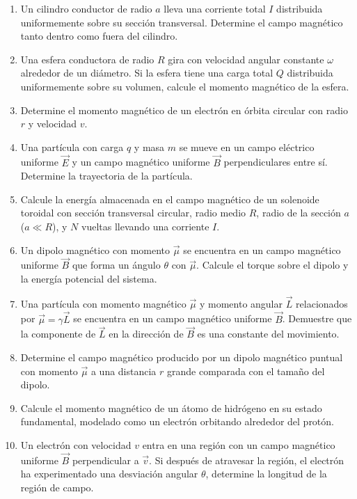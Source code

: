 \documentclass[12pt,a4paper]{book}
\begin{document}
\begin{enumerate}
\item Un cilindro conductor de radio $a$ lleva una corriente total $I$ distribuida uniformemente sobre su sección transversal. Determine el campo magnético tanto dentro como fuera del cilindro.

\item Una esfera conductora de radio $R$ gira con velocidad angular constante $\omega$ alrededor de un diámetro. Si la esfera tiene una carga total $Q$ distribuida uniformemente sobre su volumen, calcule el momento magnético de la esfera.

\item Determine el momento magnético de un electrón en órbita circular con radio $r$ y velocidad $v$.

\item Una partícula con carga $q$ y masa $m$ se mueve en un campo eléctrico uniforme $\vec{E}$ y un campo magnético uniforme $\vec{B}$ perpendiculares entre sí. Determine la trayectoria de la partícula.

\item Calcule la energía almacenada en el campo magnético de un solenoide toroidal con sección transversal circular, radio medio $R$, radio de la sección $a$ ($a \ll R$), y $N$ vueltas llevando una corriente $I$.

\item Un dipolo magnético con momento $\vec{\mu}$ se encuentra en un campo magnético uniforme $\vec{B}$ que forma un ángulo $\theta$ con $\vec{\mu}$. Calcule el torque sobre el dipolo y la energía potencial del sistema.

\item Una partícula con momento magnético $\vec{\mu}$ y momento angular $\vec{L}$ relacionados por $\vec{\mu} = \gamma \vec{L}$ se encuentra en un campo magnético uniforme $\vec{B}$. Demuestre que la componente de $\vec{L}$ en la dirección de $\vec{B}$ es una constante del movimiento.

\item Determine el campo magnético producido por un dipolo magnético puntual con momento $\vec{\mu}$ a una distancia $r$ grande comparada con el tamaño del dipolo.

\item Calcule el momento magnético de un átomo de hidrógeno en su estado fundamental, modelado como un electrón orbitando alrededor del protón.

\item Un electrón con velocidad $v$ entra en una región con un campo magnético uniforme $\vec{B}$ perpendicular a $\vec{v}$. Si después de atravesar la región, el electrón ha experimentado una desviación angular $\theta$, determine la longitud de la región de campo.
\end{enumerate}
\end{document}
